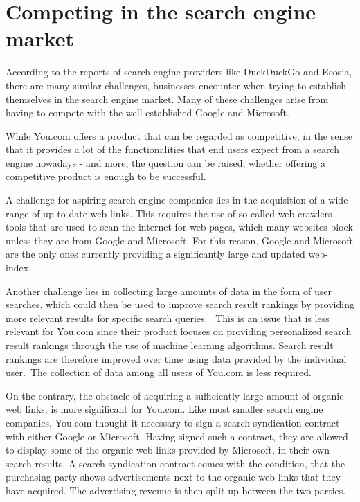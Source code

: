 \documentclass[5p,twocolumn,final]{elsarticle}
\begin{document}
\section{Competing in the search engine market}
According to the reports of search engine providers like DuckDuckGo and Ecosia, there are many similar challenges, businesses encounter when trying to establish themselves in the search engine market. Many of these challenges arise from having to compete with the well-established Google and Microsoft.~\cite{green_business, duckduckgo_whitepaper} \par
While You.com offers a product that can be regarded as competitive, in the sense that it provides a lot of the functionalities that end users expect from a search engine nowadays - and more, the question can be raised, whether offering a competitive product is enough to be successful. \par
A challenge for aspiring search engine companies lies in the acquisition of a wide range of up-to-date web links. This requires the use of so-called web crawlers - tools that are used to scan the internet for web pages, which many websites block unless they are from Google and Microsoft. For this reason, Google and Microsoft are the only ones currently providing a significantly large and updated web-index.~\cite{duckduckgo_whitepaper} \par
Another challenge lies in collecting large amounts of data in the form of user searches, which could then be used to improve search result rankings by providing more relevant results for specific search queries.~\cite{google_data} This is an issue that is less relevant for You.com since their product focuses on providing personalized search result rankings through the use of machine learning algorithms. Search result rankings are therefore improved over time using data provided by the individual user.~The collection of data among all users of You.com is less required.~\cite{youcom_ai} \par 
On the contrary, the obstacle of acquiring a sufficiently large amount of organic web links, is more significant for You.com. Like most smaller search engine companies, You.com thought it necessary to sign a search syndication contract with either Google or Microsoft. Having signed such a contract, they are allowed to display some of the organic web links provided by Microsoft, in their own search results. A search syndication contract comes with the condition, that the purchasing party shows advertisements next to the organic web links that they have acquired. The advertising revenue is then split up between the two parties.~\cite{duckduckgo_whitepaper} \par
\end{document}
